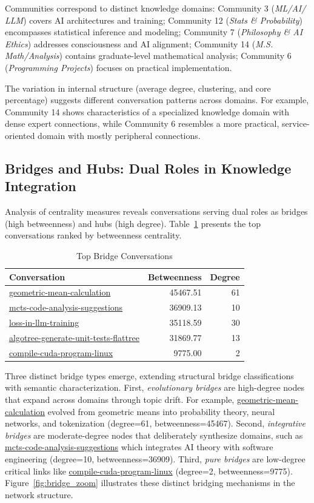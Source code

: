 \documentclass{svproc}
\begin{document}
Communities correspond to distinct knowledge domains: Community 3 (\emph{ML/AI/\\LLM}) covers AI architectures and training; Community 12 (\emph{Stats \& Probability}) encompasses statistical inference and modeling; Community 7 (\emph{Philosophy \& AI Ethics}) addresses consciousness and AI alignment; Community 14 (\emph{M.S. Math/Analysis}) contains graduate-level mathematical analysis; Community 6 (\emph{Programming Projects}) focuses on practical implementation.

The variation in internal structure (average degree, clustering, and core percentage) suggests different conversation patterns across domains. For example, Community 14 shows characteristics of a specialized knowledge domain with dense expert connections, while Community 6 resembles a more practical, service-oriented domain with mostly peripheral connections.

\subsection{Bridges and Hubs: Dual Roles in Knowledge Integration}

Analysis of centrality measures reveals conversations serving dual roles as bridges (high betweenness) and hubs (high degree). Table~\ref{tab:bridges} presents the top conversations ranked by betweenness centrality.

\begin{table}
\centering
\caption{Top Bridge Conversations}
\label{tab:bridges}
\begin{tabular}{lrr}
\toprule
\textbf{Conversation} & \textbf{Betweenness} & \textbf{Degree} \\
\midrule
\url{geometric-mean-calculation} & 45467.51 & 61 \\
\url{mcts-code-analysis-suggestions} & 36909.13 & 10 \\
\url{loss-in-llm-training} & 35118.59 & 30 \\
\url{algotree-generate-unit-tests-flattree} & 31869.77 & 13 \\
\url{compile-cuda-program-linux} & 9775.00 & 2 \\
\bottomrule
\end{tabular}
\end{table}

Three distinct bridge types emerge, extending structural bridge classifications \cite{granovetter1973,burt1992} with semantic characterization. First, \emph{evolutionary bridges} are high-degree nodes that expand across domains through topic drift. For example, \url{geometric-mean-calculation} evolved from geometric means into probability theory, neural networks, and tokenization (degree=61, betweenness=45467). Second, \emph{integrative bridges} are moderate-degree nodes that deliberately synthesize domains, such as \url{mcts-code-analysis-suggestions} which integrates AI theory with software engineering (degree=10, betweenness=36909). Third, \emph{pure bridges} are low-degree critical links like \url{compile-cuda-program-linux} (degree=2, betweenness=9775). Figure~\ref{fig:bridge_zoom} illustrates these distinct bridging mechanisms in the network structure.
\end{document}
